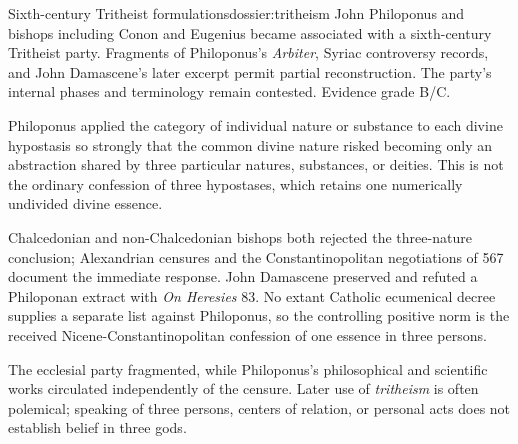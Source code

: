 \begin{heresydossier}{Sixth-century Tritheist formulations}{dossier:tritheism}
\objectfield John Philoponus and bishops including Conon and Eugenius became associated with a sixth-century Tritheist party. Fragments of Philoponus's \emph{Arbiter}, Syriac controversy records, and John Damascene's later excerpt permit partial reconstruction. The party's internal phases and terminology remain contested. Evidence grade B/C.

\propositionfield Philoponus applied the category of individual nature or substance to each divine hypostasis so strongly that the common divine nature risked becoming only an abstraction shared by three particular natures, substances, or deities. This is not the ordinary confession of three hypostases, which retains one numerically undivided divine essence.

\responsefield Chalcedonian and non-Chalcedonian bishops both rejected the three-nature conclusion; Alexandrian censures and the Constantinopolitan negotiations of 567 document the immediate response. John Damascene preserved and refuted a Philoponan extract with \emph{On Heresies} 83. No extant Catholic ecumenical decree supplies a separate list against Philoponus, so the controlling positive norm is the received Nicene-Constantinopolitan confession of one essence in three persons.

\aftermathfield The ecclesial party fragmented, while Philoponus's philosophical and scientific works circulated independently of the censure. Later use of \emph{tritheism} is often polemical; speaking of three persons, centers of relation, or personal acts does not establish belief in three gods.
\end{heresydossier}


